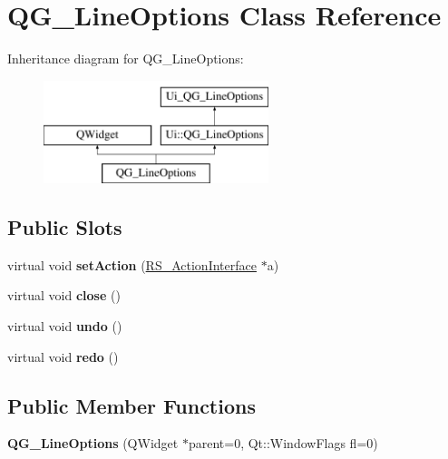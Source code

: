 \hypertarget{classQG__LineOptions}{\section{Q\-G\-\_\-\-Line\-Options Class Reference}
\label{classQG__LineOptions}
}
Inheritance diagram for Q\-G\-\_\-\-Line\-Options\-:\begin{figure}[H]
\begin{center}
\leavevmode
\includegraphics[height=3.000000cm]{classQG__LineOptions}
\end{center}
\end{figure}
\subsection*{Public Slots}
\begin{DoxyCompactItemize}
\item 
\hypertarget{classQG__LineOptions_a7376b7f7956038ddc864f31544237b4e}{virtual void {\bfseries set\-Action} (\hyperlink{classRS__ActionInterface}{R\-S\-\_\-\-Action\-Interface} $\ast$a)}\label{classQG__LineOptions_a7376b7f7956038ddc864f31544237b4e}

\item 
\hypertarget{classQG__LineOptions_a6815fb02f7ee212ae52b62d408a813ea}{virtual void {\bfseries close} ()}\label{classQG__LineOptions_a6815fb02f7ee212ae52b62d408a813ea}

\item 
\hypertarget{classQG__LineOptions_ae7b74665275eaa3cc4578b2dd1a95daf}{virtual void {\bfseries undo} ()}\label{classQG__LineOptions_ae7b74665275eaa3cc4578b2dd1a95daf}

\item 
\hypertarget{classQG__LineOptions_a61656d71d9ec2f6aa1772b197ecf3975}{virtual void {\bfseries redo} ()}\label{classQG__LineOptions_a61656d71d9ec2f6aa1772b197ecf3975}

\end{DoxyCompactItemize}
\subsection*{Public Member Functions}
\begin{DoxyCompactItemize}
\item 
\hypertarget{classQG__LineOptions_a78b4511d1253e854b8500a7e5dbbd19d}{{\bfseries Q\-G\-\_\-\-Line\-Options} (Q\-Widget $\ast$parent=0, Qt\-::\-Window\-Flags fl=0)}\label{classQG__LineOptions_a78b4511d1253e854b8500a7e5dbbd19d}

\end{DoxyCompactItemize}
